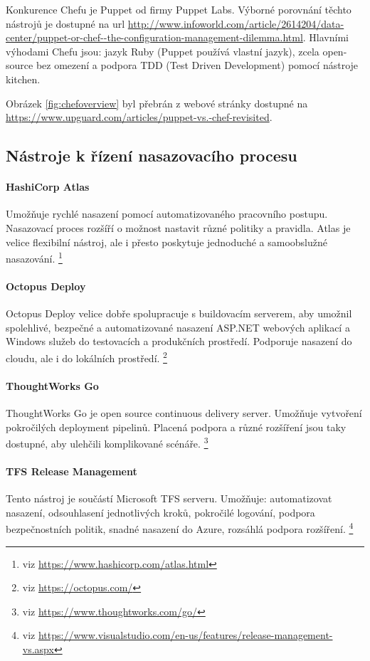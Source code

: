 Konkurence Chefu je Puppet od firmy Puppet Labs. Výborné porovnání těchto nástrojů je dostupné na url \url{http://www.infoworld.com/article/2614204/data-center/puppet-or-chef--the-configuration-management-dilemma.html}. Hlavními výhodami Chefu jsou: jazyk Ruby (Puppet používá vlastní jazyk), zcela open-source bez omezení a podpora TDD (Test Driven Development) pomocí nástroje kitchen.

Obrázek \ref{fig:chefoverview} byl přebrán z webové stránky dostupné na \url{https://www.upguard.com/articles/puppet-vs.-chef-revisited}.

\subsection{Nástroje k řízení nasazovacího procesu}
\paragraph{HashiCorp Atlas}
Umožňuje rychlé nasazení pomocí automatizovaného pracovního postupu. Nasazovací proces rozšíří o možnost nastavit různé politiky a pravidla. Atlas je velice flexibilní nástroj, ale i přesto poskytuje jednoduché a samoobslužné nasazování. \footnote{viz \url{https://www.hashicorp.com/atlas.html}}

\paragraph{Octopus Deploy}
Octopus Deploy velice dobře spolupracuje s buildovacím serverem, aby umožnil spolehlivé, bezpečné a automatizované nasazení ASP.NET webových aplikací a Windows služeb do testovacích a produkčních prostředí. Podporuje nasazení do cloudu, ale i do lokálních prostředí. \footnote{viz \url{https://octopus.com/}}

\paragraph{ThoughtWorks Go}
ThoughtWorks Go je open source continuous delivery server. Umožňuje vytvoření pokročilých deployment pipelinů. Placená podpora a různé rozšíření jsou taky dostupné, aby ulehčili komplikované scénáře. \footnote{viz \url{https://www.thoughtworks.com/go/}}

\paragraph{TFS Release Management}
Tento nástroj je součástí Microsoft TFS serveru. Umožňuje: automatizovat nasazení, odsouhlasení jednotlivých kroků, pokročilé logování, podpora bezpečnostních politik, snadné nasazení do Azure, rozsáhlá podpora rozšíření. \footnote{viz \url{https://www.visualstudio.com/en-us/features/release-management-vs.aspx}}

